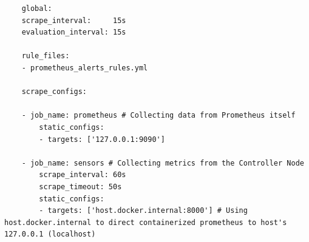 \begin{verbatim}
    global:
    scrape_interval:     15s
    evaluation_interval: 15s

    rule_files:
    - prometheus_alerts_rules.yml

    scrape_configs:

    - job_name: prometheus # Collecting data from Prometheus itself
        static_configs:
        - targets: ['127.0.0.1:9090']

    - job_name: sensors # Collecting metrics from the Controller Node
        scrape_interval: 60s
        scrape_timeout: 50s
        static_configs:
        - targets: ['host.docker.internal:8000'] # Using host.docker.internal to direct containerized prometheus to host's 127.0.0.1 (localhost)
\end{verbatim}

